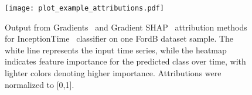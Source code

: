\begin{figure}[!htbp]
\texttt{[image: plot\_example\_attributions.pdf]}
\caption{Output from Gradients~\cite{simonyan.etal_2014_deep} and Gradient SHAP~\cite{lundberg.lee_2017_unified} attribution methods for InceptionTime~\cite{ismailfawaz.etal_2020_inceptiontime} classifier on one FordB dataset sample. The white line represents the input time series, while the heatmap indicates feature importance for the predicted class over time, with lighter colors denoting higher importance. Attributions were normalized to [0,1].}\label{fig:example_attributions}
\end{figure}